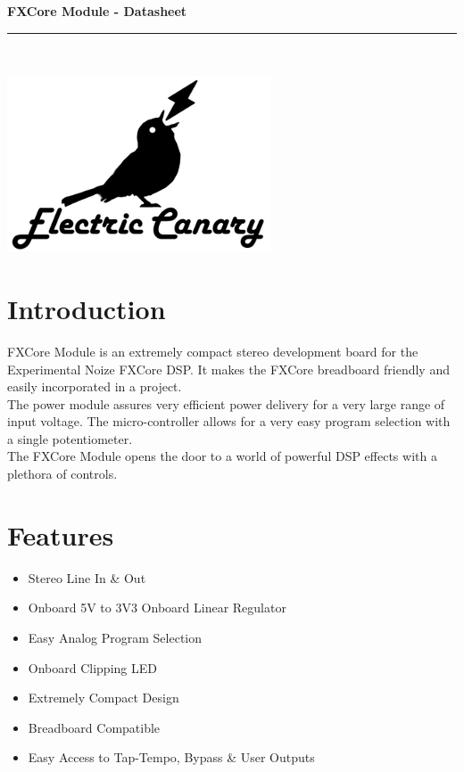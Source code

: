 \documentclass[a4paper, 10pt]{article}
\begin{document}
\thispagestyle{plain}
\begin{center}
\begin{Huge}
\vspace*{0.5cm}
\textbf{FXCore Module - Datasheet}
\rule {0.95\textwidth}{2pt}\\
\end{Huge}
\vspace{1cm}
\includegraphics[scale=1]{logocentre}\\
\vspace{1cm}
\end{center}

\begin{multicols}{2}
\section{Introduction}
\bigbreak
FXCore Module is an extremely compact stereo development board for the Experimental Noize FXCore DSP. It makes the FXCore breadboard friendly and easily incorporated in a project.\\

The power module assures very efficient power delivery for a very large range of input voltage. The micro-controller allows for a very easy program selection with a single potentiometer.\\

The FXCore Module opens the door to a world of powerful DSP effects with a plethora of controls.
\vfill\null
\columnbreak

\section{Features}
\bigbreak
\begin{itemize}
\item Stereo Line In \& Out
\item Onboard 5V to 3V3 Onboard Linear Regulator
\item Easy Analog Program Selection
\item Onboard Clipping LED
\item Extremely Compact Design
\item Breadboard Compatible
\item Easy Access to Tap-Tempo, Bypass \& User Outputs
\end{itemize}
\end{multicols}
\end{document}
